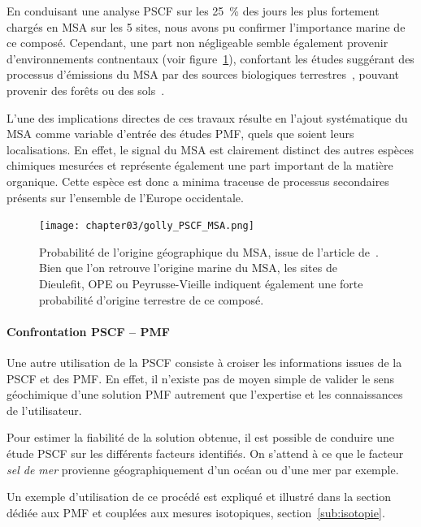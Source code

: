 En conduisant une analyse PSCF sur les \SI{25}{\percent} des jours les plus fortement chargés en MSA
sur les 5 sites, nous avons pu confirmer l'importance marine de ce composé. 
Cependant, une part non négligeable semble également provenir d'environnements
contnentaux (voir
figure~\ref{fig:chapter03/golly_PSCF_MSA}), confortant les études suggérant des processus
d'émissions du MSA par des sources biologiques terrestres~\autocite{bozzettiArgon2017},
pouvant provenir des forêts ou des
sols~\autocite{jardineDimethyl2015,miyazakiSeasonal2012}.

L'une des implications directes de ces travaux résulte en l'ajout systématique du MSA
comme variable d'entrée des études PMF, quels que soient leurs localisations. En effet, le
signal du MSA est clairement distinct des autres espèces chimiques mesurées et représente
également une part important de la matière organique. Cette espèce est donc a minima
traceuse de processus secondaires présents sur l'ensemble de l'Europe occidentale.

\begin{figure}[ht!]
    \centering
    \texttt{[image: chapter03/golly\_PSCF\_MSA.png]}
    \caption{Probabilité de l'origine géographique du MSA, issue de l'article
        de~\textcite{gollyOrganic2019}. Bien que l'on retrouve l'origine marine du MSA,
        les sites de Dieulefit, OPE ou Peyrusse-Vieille indiquent également une forte
        probabilité d'origine terrestre de ce composé.}%
    \label{fig:chapter03/golly_PSCF_MSA}
\end{figure}

\paragraph{Confrontation PSCF -- PMF}%
\label{par:confrontation_pscf_pmf}

Une autre utilisation de la PSCF consiste à croiser les informations issues de la PSCF et
des PMF.
En effet, il n'existe pas de moyen simple de valider le sens géochimique d'une solution
PMF autrement que l'expertise et les connaissances de l'utilisateur.

Pour estimer la fiabilité de la solution obtenue, il est possible de conduire une
étude PSCF sur les différents facteurs identifiés. On s'attend à ce que le
facteur \textit{sel de mer} provienne géographiquement d'un océan ou d'une mer par
exemple.

Un exemple d'utilisation de ce procédé est expliqué et illustré dans la section dédiée aux
PMF et couplées aux mesures isotopiques, section~\ref{sub:isotopie}.



